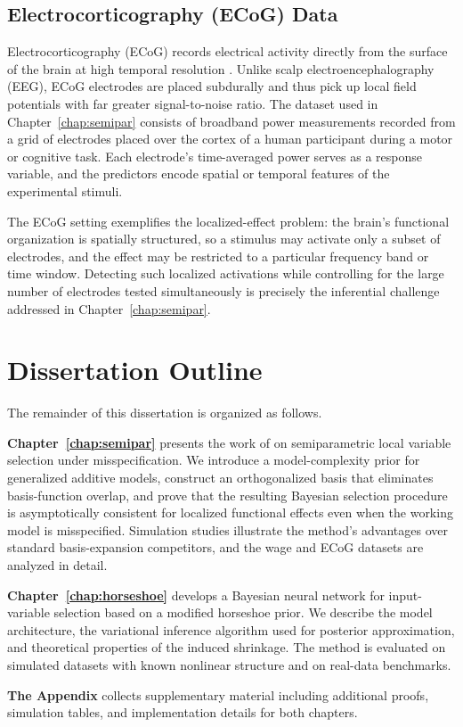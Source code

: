 \subsection{Electrocorticography (ECoG) Data}
\label{subsec:data-ecog}

Electrocorticography (ECoG) records electrical activity directly from
the surface of the brain at high temporal resolution
\citep{miller2009power}. Unlike scalp electroencephalography (EEG),
ECoG electrodes are placed subdurally and thus pick up local field
potentials with far greater signal-to-noise ratio. The dataset used in
Chapter~\ref{chap:semipar} consists of broadband power measurements
recorded from a grid of electrodes placed over the cortex of a human
participant during a motor or cognitive task. Each electrode's
time-averaged power serves as a response variable, and the predictors
encode spatial or temporal features of the experimental stimuli.

The ECoG setting exemplifies the localized-effect problem: the brain's
functional organization is spatially structured, so a stimulus may
activate only a subset of electrodes, and the effect may be restricted
to a particular frequency band or time window. Detecting such localized
activations while controlling for the large number of electrodes tested
simultaneously is precisely the inferential challenge addressed in
Chapter~\ref{chap:semipar}.

\section{Dissertation Outline}
\label{sec:intro-outline}

The remainder of this dissertation is organized as follows.

\textbf{Chapter~\ref{chap:semipar}} presents the work of
\citet{rossell2025semiparametric} on semiparametric local variable
selection under misspecification. We introduce a model-complexity prior
for generalized additive models, construct an orthogonalized basis that
eliminates basis-function overlap, and prove that the resulting Bayesian
selection procedure is asymptotically consistent for localized
functional effects even when the working model is misspecified.
Simulation studies illustrate the method's advantages over standard
basis-expansion competitors, and the wage and ECoG datasets are
analyzed in detail.

\textbf{Chapter~\ref{chap:horseshoe}} develops a Bayesian neural
network for input-variable selection based on a modified horseshoe
prior. We describe the model architecture, the variational inference
algorithm used for posterior approximation, and theoretical properties
of the induced shrinkage. The method is evaluated on simulated datasets
with known nonlinear structure and on real-data benchmarks.

\textbf{The Appendix} collects supplementary material including
additional proofs, simulation tables, and implementation details for
both chapters.

